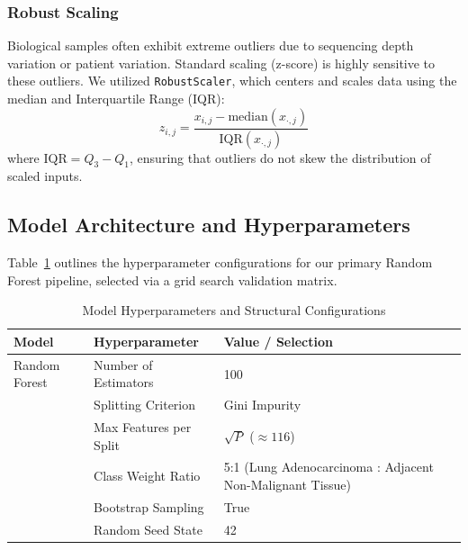 \documentclass[journal,10pt]{IEEEtran}
\begin{document}
\subsubsection{Robust Scaling}
Biological samples often exhibit extreme outliers due to sequencing depth variation or patient variation. Standard scaling (z-score) is highly sensitive to these outliers. We utilized \texttt{RobustScaler}, which centers and scales data using the median and Interquartile Range (IQR):
\begin{equation}
z_{i,j} = \frac{x_{i,j} - \text{median}(x_{\cdot, j})}{\text{IQR}(x_{\cdot, j})}
\end{equation}
where $\text{IQR} = Q_3 - Q_1$, ensuring that outliers do not skew the distribution of scaled inputs.

\subsection{Model Architecture and Hyperparameters}
Table~\ref{tab:hyperparameters} outlines the hyperparameter configurations for our primary Random Forest pipeline, selected via a grid search validation matrix.

\begin{table}[htbp]
\centering
\caption{Model Hyperparameters and Structural Configurations}
\label{tab:hyperparameters}
\begin{tabular}{lll}
\toprule
\textbf{Model} & \textbf{Hyperparameter} & \textbf{Value / Selection} \\
\midrule
Random Forest & Number of Estimators & 100 \\
              & Splitting Criterion & Gini Impurity \\
              & Max Features per Split & $\sqrt{P}$ ($\approx 116$) \\
              & Class Weight Ratio & 5:1 (Lung Adenocarcinoma : Adjacent Non-Malignant Tissue) \\
              & Bootstrap Sampling & True \\
              & Random Seed State & 42 \\
\bottomrule
\end{tabular}
\end{table}
\end{document}
